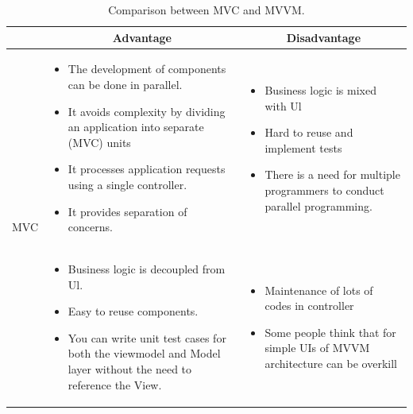 \begin{table}[H]
    \centering
    \begin{tabular}{| c | p{} | p{} |}
        \hline
        \multicolumn{1}{|c|}{}
        & \multicolumn{1}{c|}{Advantage}
        & \multicolumn{1}{c|}{Disadvantage} \\ \hline
        \multirow{7}{*}{MVC}     
                &   \begin{itemize}[leftmargin=*,topsep=0pt,partopsep=0pt,parsep=0pt]
                        \item The development of components can be done in parallel.
                        \item It avoids complexity by dividing an application into separate (MVC) units
                        \item It processes application requests using a single controller.
                        \item It provides separation of concerns.
                    \end{itemize}
                &   \begin{itemize}[leftmargin=*,topsep=0pt,partopsep=0pt,parsep=0pt]
                        \item Business logic is mixed with Ul
                        \item Hard to reuse and implement tests
                        \item There is a need for multiple programmers to conduct parallel programming.
                    \end{itemize} \\ \hline
        \multirow{6}{*}{MVVC}
                &   \begin{itemize}[leftmargin=*,topsep=0pt,partopsep=0pt,parsep=0pt]
                        \item Business logic is decoupled from Ul.
                        \item Easy to reuse components.
                        \item You can write unit test cases for both the viewmodel and Model layer without the need to reference the View.
                    \end{itemize}
                &   \begin{itemize}[leftmargin=*,topsep=0pt,partopsep=0pt,parsep=0pt]
                        \item Maintenance of lots of codes in controller
                        \item Some people think that for simple UIs of MVVM architecture can be overkill
                    \end{itemize} \\ \hline
    \end{tabular}
    \caption{Comparison between MVC and MVVM.}
\end{table}

